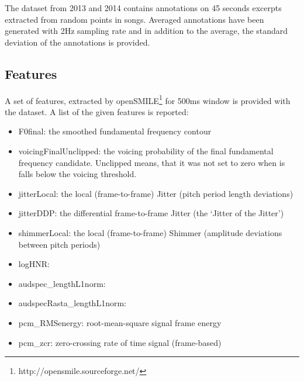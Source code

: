 
The dataset from 2013 and 2014 contains annotations on 45 seconds excerpts extracted from random points in songs. 
Averaged annotations have been generated with 2Hz sampling rate and in addition to the average, the standard deviation of the annotations is provided.~\cite{soleymani2016deam}


\subsection{Features}

A set of features, extracted by openSMILE\footnote{http://opensmile.sourceforge.net/} for 500ms window is provided with the dataset. 
A list of the given features is reported:


\begin{itemize}
	\item F0final: the smoothed fundamental frequency contour
	\item voicingFinalUnclipped: the voicing probability of the final fundamental frequency candidate. Unclipped means, that it was not set to zero when is falls below the voicing threshold.

	\item jitterLocal: the local (frame-to-frame) Jitter (pitch period length deviations)

	\item jitterDDP: the differential frame-to-frame Jitter (the ‘Jitter of the Jitter’)

	\item shimmerLocal: the local (frame-to-frame) Shimmer (amplitude deviations between pitch periods)
	\item logHNR: 
	\item audspec\_lengthL1norm: 
	\item audspecRasta\_lengthL1norm: 
	\item pcm\_RMSenergy: root-mean-square signal frame energy

	\item pcm\_zcr: zero-crossing rate of time signal (frame-based)


\end{itemize}
